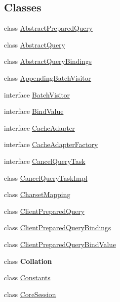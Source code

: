 \subsection*{Classes}
\begin{DoxyCompactItemize}
\item 
class \mbox{\hyperlink{classcom_1_1mysql_1_1cj_1_1_abstract_prepared_query}{Abstract\+Prepared\+Query}}
\item 
class \mbox{\hyperlink{classcom_1_1mysql_1_1cj_1_1_abstract_query}{Abstract\+Query}}
\item 
class \mbox{\hyperlink{classcom_1_1mysql_1_1cj_1_1_abstract_query_bindings}{Abstract\+Query\+Bindings}}
\item 
class \mbox{\hyperlink{classcom_1_1mysql_1_1cj_1_1_appending_batch_visitor}{Appending\+Batch\+Visitor}}
\item 
interface \mbox{\hyperlink{interfacecom_1_1mysql_1_1cj_1_1_batch_visitor}{Batch\+Visitor}}
\item 
interface \mbox{\hyperlink{interfacecom_1_1mysql_1_1cj_1_1_bind_value}{Bind\+Value}}
\item 
interface \mbox{\hyperlink{interfacecom_1_1mysql_1_1cj_1_1_cache_adapter}{Cache\+Adapter}}
\item 
interface \mbox{\hyperlink{interfacecom_1_1mysql_1_1cj_1_1_cache_adapter_factory}{Cache\+Adapter\+Factory}}
\item 
interface \mbox{\hyperlink{interfacecom_1_1mysql_1_1cj_1_1_cancel_query_task}{Cancel\+Query\+Task}}
\item 
class \mbox{\hyperlink{classcom_1_1mysql_1_1cj_1_1_cancel_query_task_impl}{Cancel\+Query\+Task\+Impl}}
\item 
class \mbox{\hyperlink{classcom_1_1mysql_1_1cj_1_1_charset_mapping}{Charset\+Mapping}}
\item 
class \mbox{\hyperlink{classcom_1_1mysql_1_1cj_1_1_client_prepared_query}{Client\+Prepared\+Query}}
\item 
class \mbox{\hyperlink{classcom_1_1mysql_1_1cj_1_1_client_prepared_query_bindings}{Client\+Prepared\+Query\+Bindings}}
\item 
class \mbox{\hyperlink{classcom_1_1mysql_1_1cj_1_1_client_prepared_query_bind_value}{Client\+Prepared\+Query\+Bind\+Value}}
\item 
class {\bfseries Collation}
\item 
class \mbox{\hyperlink{classcom_1_1mysql_1_1cj_1_1_constants}{Constants}}
\item 
class \mbox{\hyperlink{classcom_1_1mysql_1_1cj_1_1_core_session}{Core\+Session}}

\end{DoxyCompactItemize}
